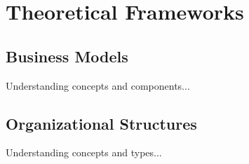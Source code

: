 \chapter{Theoretical Frameworks}
\label{chap:theory}

\section{Business Models}

Understanding concepts and components...

\section{Organizational Structures}

Understanding concepts and types...
